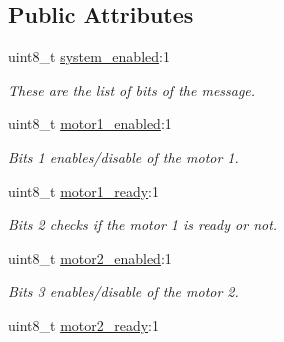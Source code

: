 \subsection*{Public Attributes}
\begin{DoxyCompactItemize}
\item 
uint8\+\_\+t \hyperlink{classblmc__drivers_1_1MotorBoardStatus_a9984f10f289f1a853dd4e34544be2c9d}{system\+\_\+enabled}\+:1
\begin{DoxyCompactList}\small\item\em These are the list of bits of the message. \end{DoxyCompactList}\item 
uint8\+\_\+t \hyperlink{classblmc__drivers_1_1MotorBoardStatus_ae571da09a338790e07847efb068168af}{motor1\+\_\+enabled}\+:1\hypertarget{classblmc__drivers_1_1MotorBoardStatus_ae571da09a338790e07847efb068168af}{}\label{classblmc__drivers_1_1MotorBoardStatus_ae571da09a338790e07847efb068168af}

\begin{DoxyCompactList}\small\item\em Bits 1 enables/disable of the motor 1. \end{DoxyCompactList}\item 
uint8\+\_\+t \hyperlink{classblmc__drivers_1_1MotorBoardStatus_a223efb9b461331c2e80b922ec29458cf}{motor1\+\_\+ready}\+:1\hypertarget{classblmc__drivers_1_1MotorBoardStatus_a223efb9b461331c2e80b922ec29458cf}{}\label{classblmc__drivers_1_1MotorBoardStatus_a223efb9b461331c2e80b922ec29458cf}

\begin{DoxyCompactList}\small\item\em Bits 2 checks if the motor 1 is ready or not. \end{DoxyCompactList}\item 
uint8\+\_\+t \hyperlink{classblmc__drivers_1_1MotorBoardStatus_a3f21330096dc12e6ef6fa2cd2d628c06}{motor2\+\_\+enabled}\+:1\hypertarget{classblmc__drivers_1_1MotorBoardStatus_a3f21330096dc12e6ef6fa2cd2d628c06}{}\label{classblmc__drivers_1_1MotorBoardStatus_a3f21330096dc12e6ef6fa2cd2d628c06}

\begin{DoxyCompactList}\small\item\em Bits 3 enables/disable of the motor 2. \end{DoxyCompactList}\item 
uint8\+\_\+t \hyperlink{classblmc__drivers_1_1MotorBoardStatus_a4f0191a042a1968c8938177ad13fb760}{motor2\+\_\+ready}\+:1\hypertarget{classblmc__drivers_1_1MotorBoardStatus_a4f0191a042a1968c8938177ad13fb760}{}\label{classblmc__drivers_1_1MotorBoardStatus_a4f0191a042a1968c8938177ad13fb760}


\end{DoxyCompactItemize}
